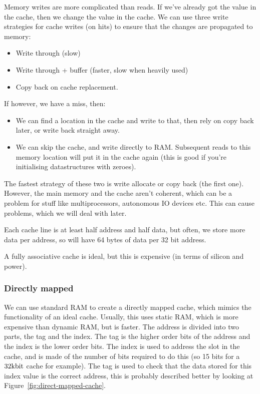 Memory writes are more complicated than reads. If we've already got the value in
the cache, then we change the value in the cache. We can use three write
strategies for cache writes (on hits) to ensure that the changes are propagated
to memory:

\begin{itemize}
	\item Write through (slow)
	\item Write through + buffer (faster, slow when heavily used)
	\item Copy back on cache replacement.
\end{itemize}

If however, we have a miss, then:

\begin{itemize}
	\item We can find a location in the cache and write to that, then rely on
	copy back later, or write back straight away.
	\item We can skip the cache, and write directly to RAM. Subsequent reads to
  this memory location will	put it in the cache again (this is good if you're
  initialising datastructures	with zeroes).
\end{itemize}


The fastest strategy of these two is write allocate or copy back (the first
one). However, the main memory and the cache aren't coherent, which can be a
problem for stuff like multiprocessors, autonomous IO devices etc. This can
cause problems, which we will deal with later.

Each cache line is at least half address and half data, but often, we store more
data per address, so will have 64 bytes of data per 32 bit address.

A fully associative cache is ideal, but this is expensive (in terms of silicon
and power).

\subsubsection{Directly mapped}

We can use standard RAM to create a directly mapped cache, which mimics the
functionality of an ideal cache. Usually, this uses static RAM, which is more
expensive than dynamic RAM, but is faster. The address is divided into two
parts, the tag and the index. The tag is the higher order bits of the address
and the index is the lower order bits. The index is used to address the slot in
the cache, and is made of the number of bits required to do this (so 15 bits for
a $32\si{\kilo\bit}$ cache for example). The tag is used to check that the data
stored for this index value is the correct address, this is probably described
better by looking at Figure~\ref{fig:direct-mapped-cache}.

